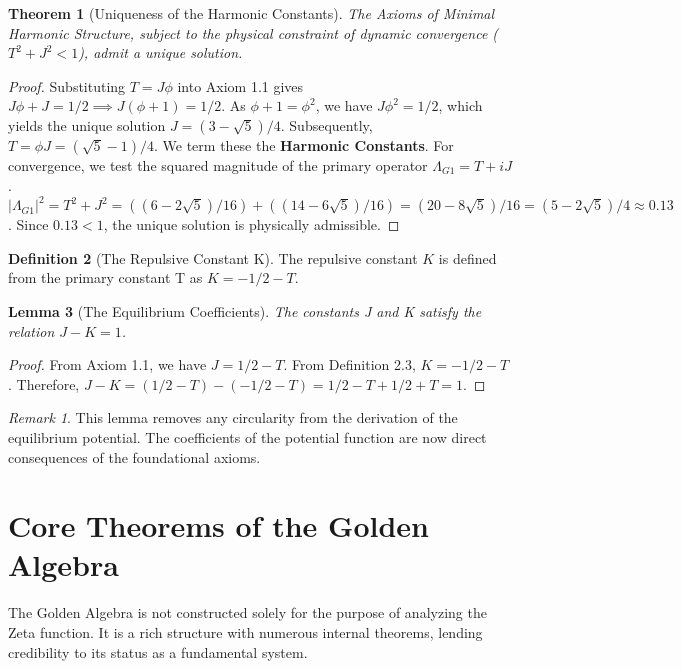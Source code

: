 \documentclass{article}
\theoremstyle{plain}
\newtheorem{theorem}{Theorem}[section]
\newtheorem{lemma}[theorem]{Lemma}
\theoremstyle{definition}
\newtheorem{definition}[theorem]{Definition}
\theoremstyle{remark}
\newtheorem*{remark}{Remark}
\begin{document}
\begin{theorem}[Uniqueness of the Harmonic Constants]
The Axioms of Minimal Harmonic Structure, subject to the physical constraint of dynamic convergence ($T^2+J^2 < 1$), admit a unique solution.
\end{theorem}
\begin{proof}
Substituting $T=J\phi$ into Axiom 1.1 gives $J\phi+J=1/2 \implies J(\phi+1)=1/2$. As $\phi+1=\phi^2$, we have $J\phi^2=1/2$, which yields the unique solution $J=(3-\sqrt{5})/4$. Subsequently, $T=\phi J = (\sqrt{5}-1)/4$. We term these the \textbf{Harmonic Constants}. For convergence, we test the squared magnitude of the primary operator $\Lambda_{G1} = T+iJ$. $|\Lambda_{G1}|^2 = T^2+J^2 = ((6-2\sqrt{5})/16) + ((14-6\sqrt{5})/16) = (20-8\sqrt{5})/16 = (5-2\sqrt{5})/4 \approx 0.13$. Since $0.13 < 1$, the unique solution is physically admissible.
\end{proof}

\begin{definition}[The Repulsive Constant K]
The repulsive constant $K$ is defined from the primary constant T as $K = -1/2 - T$.
\end{definition}

\begin{lemma}[The Equilibrium Coefficients]
The constants J and K satisfy the relation $J-K=1$.
\end{lemma}
\begin{proof}
From Axiom 1.1, we have $J = 1/2 - T$. From Definition 2.3, $K = -1/2 - T$.
Therefore, $J-K = (1/2 - T) - (-1/2 - T) = 1/2 - T + 1/2 + T = 1$.
\end{proof}
\begin{remark}
This lemma removes any circularity from the derivation of the equilibrium potential. The coefficients of the potential function are now direct consequences of the foundational axioms.
\end{remark}

\section{Core Theorems of the Golden Algebra}
The Golden Algebra is not constructed solely for the purpose of analyzing the Zeta function. It is a rich structure with numerous internal theorems, lending credibility to its status as a fundamental system.
\end{document}
